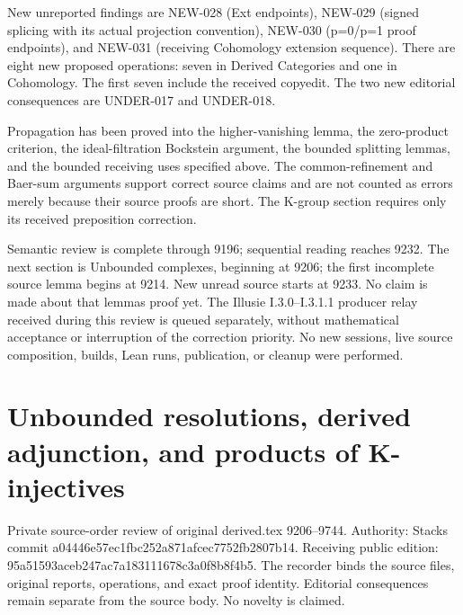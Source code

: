 \documentclass[11pt]{article}
\begin{document}
New unreported findings are NEW-028 (Ext endpoints)\allowbreak{},\allowbreak{} NEW-029 (signed splicing with its actual projection convention)\allowbreak{},\allowbreak{} NEW-030 (p\allowbreak{}=0/\allowbreak{}p\allowbreak{}=1 proof endpoints)\allowbreak{},\allowbreak{} and NEW-031 (receiving Cohomology extension sequence)\allowbreak{}. There are eight new proposed operations:\allowbreak{} seven in Derived Categories and one in Cohomology. The first seven include the received copyedit. The two new editorial consequences are UNDER-017 and UNDER-018.

Propagation has been proved into the higher-vanishing lemma,\allowbreak{} the zero-product criterion,\allowbreak{} the ideal-filtration Bockstein argument,\allowbreak{} the bounded splitting lemmas,\allowbreak{} and the bounded receiving uses specified above. The common-refinement and Baer-sum arguments support correct source claims and are not counted as errors merely because their source proofs are short. The K-group section requires only its received preposition correction.

Semantic review is complete through 9196; sequential reading reaches 9232. The next section is Unbounded complexes,\allowbreak{} beginning at 9206; the first incomplete source lemma begins at 9214. New unread source starts at 9233. No claim is made about that lemma\textquotesingle s proof yet. The Illusie I.3.0–\allowbreak{}I.3.1.1 producer relay received during this review is queued separately,\allowbreak{} without mathematical acceptance or interruption of the correction priority. No new sessions,\allowbreak{} live source composition,\allowbreak{} builds,\allowbreak{} Lean runs,\allowbreak{} publication,\allowbreak{} or cleanup were performed.
\clearpage
\section{\texorpdfstring{Unbounded resolutions,\allowbreak{} derived adjunction,\allowbreak{} and products of K-injectives}{Unbounded  derived  and products of K-injectives}}\label{proofs-9206-9744-unbounded-resolutions-derived-adjunction-and-products-of-k-injectives}

Private source-order review of original derived.tex 9206–\allowbreak{}9744. Authority:\allowbreak{} Stacks commit a04446e5\allowbreak{}7ec1fbc2\allowbreak{}52a871af\allowbreak{}cec7752f\allowbreak{}b2807b14. Receiving public edition:\allowbreak{} 95a51593\allowbreak{}aceb247a\allowbreak{}c7a18311\allowbreak{}1678c3a0\allowbreak{}f8b8f4b5. The recorder binds the source files,\allowbreak{} original reports,\allowbreak{} operations,\allowbreak{} and exact proof identity. Editorial consequences remain separate from the source body. No novelty is claimed.
\end{document}
